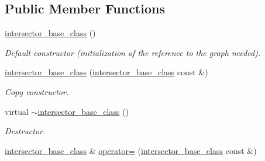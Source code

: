 \subsection*{Public Member Functions}
\begin{DoxyCompactItemize}
\item 
\hypertarget{classintersector__base__class_a8d13a4f8f6dec439866977a5b4fb0795}{
\hyperlink{classintersector__base__class_a8d13a4f8f6dec439866977a5b4fb0795}{intersector\_\-base\_\-class} ()}
\label{classintersector__base__class_a8d13a4f8f6dec439866977a5b4fb0795}

\begin{DoxyCompactList}\small\item\em Default constructor (initialization of the reference to the graph needed). \item\end{DoxyCompactList}\item 
\hypertarget{classintersector__base__class_a76525dba7cbd3b4d291281f71b2d1723}{
\hyperlink{classintersector__base__class_a76525dba7cbd3b4d291281f71b2d1723}{intersector\_\-base\_\-class} (\hyperlink{classintersector__base__class}{intersector\_\-base\_\-class} const \&)}
\label{classintersector__base__class_a76525dba7cbd3b4d291281f71b2d1723}

\begin{DoxyCompactList}\small\item\em Copy constructor. \item\end{DoxyCompactList}\item 
\hypertarget{classintersector__base__class_aeca93030cff57166c7b70b2911a7bddf}{
virtual \hyperlink{classintersector__base__class_aeca93030cff57166c7b70b2911a7bddf}{$\sim$intersector\_\-base\_\-class} ()}
\label{classintersector__base__class_aeca93030cff57166c7b70b2911a7bddf}

\begin{DoxyCompactList}\small\item\em Destructor. \item\end{DoxyCompactList}\item 
\hypertarget{classintersector__base__class_a3486613036aada6bf7174f158282649b}{
\hyperlink{classintersector__base__class}{intersector\_\-base\_\-class} \& \hyperlink{classintersector__base__class_a3486613036aada6bf7174f158282649b}{operator=} (\hyperlink{classintersector__base__class}{intersector\_\-base\_\-class} const \&)}
\label{classintersector__base__class_a3486613036aada6bf7174f158282649b}


\end{DoxyCompactItemize}
